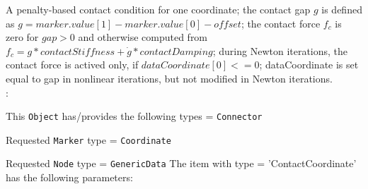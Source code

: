 \ei

%
\newpage


\label{sec:item:ObjectContactCoordinate}
A penalty-based contact condition for one coordinate; the contact gap $g$ is defined as $g=marker.value[1]- marker.value[0] - offset$; the contact force $f_c$ is zero for $gap>0$ and otherwise computed from $f_c = g*contactStiffness + \dot g*contactDamping$; during Newton iterations, the contact force is actived only, if $dataCoordinate[0] <= 0$; dataCoordinate is set equal to gap in nonlinear iterations, but not modified in Newton iterations.
\vspace{12pt}\\

\noindent {}:
\bi
  \item This \texttt{Object} has/provides the following types = \texttt{Connector}
  \item Requested \texttt{Marker} type = \texttt{Coordinate}
  \item Requested \texttt{Node} type = \texttt{GenericData}
\ei\vspace{12pt} \noindent 
The item  with type = 'ContactCoordinate' has the following parameters:
\vspace{-0.5cm}\\
\vspace{-0.5cm}\\
